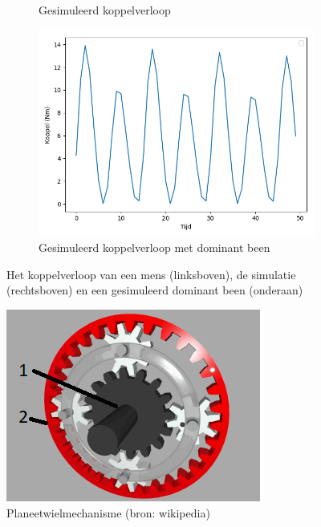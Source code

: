 \documentclass[12pt,a4paper,oneside]{book}
\begin{document}
\begin{figure}[t!]
\begin{subfigure}{.5\textwidth}
  \caption{Gesimuleerd koppelverloop}
  \label{fig:gesimuleerdkoppelverloop}
\end{subfigure}
\begin{subfigure}{.5\textwidth}
  \centering
  \includegraphics[width=\linewidth]{images/gesimuleerdekoppeldominantbeen.png}
  \caption{Gesimuleerd koppelverloop met dominant been}
  \label{fig:gesimuleerde koppel dominant been}
\end{subfigure}
\caption{Het koppelverloop van een mens (linksboven), de simulatie (rechtsboven) en een gesimuleerd dominant been (onderaan)}
\label{fig:test}
\end{figure}
\newpage
\begin{figure}
  \centering
  \includegraphics[width=\linewidth]{images/planeetwielmechanisme.png}
  \caption{Planeetwielmechanisme (bron: wikipedia)}
  \label{fig:planeetwielmechanisme}
\end{figure}
\end{document}
